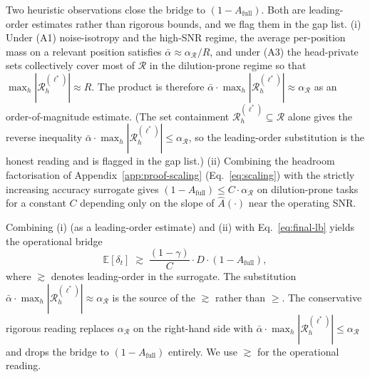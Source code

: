 Two heuristic observations close the bridge to $(1 - A_{\mathrm{full}})$.
Both are leading-order estimates rather than rigorous bounds, and we
flag them in the gap list.
(i) Under (A1) noise-isotropy and the high-SNR regime, the average
per-position mass on a relevant position satisfies $\bar\alpha \approx
\alpha_{\mathcal{R}} / R$, and under (A3) the head-private sets
collectively cover most of $\mathcal{R}$ in the dilution-prone regime so
that $\max_h |\mathcal{R}^{(\ell^*)}_h| \approx R$. The product is
therefore $\bar\alpha \cdot \max_h |\mathcal{R}^{(\ell^*)}_h| \approx
\alpha_{\mathcal{R}}$ as an order-of-magnitude estimate. (The set
containment $\mathcal{R}^{(\ell^*)}_h \subseteq \mathcal{R}$ alone gives
the reverse inequality $\bar\alpha \cdot \max_h |\mathcal{R}^{(\ell^*)}_h|
\leq \alpha_{\mathcal{R}}$, so the leading-order substitution is the
honest reading and is flagged in the gap list.)
(ii) Combining the headroom factorisation of
Appendix~\ref{app:proof-scaling} (Eq.~\eqref{eq:scaling}) with the
strictly increasing accuracy surrogate gives $(1 - A_{\mathrm{full}})
\leq C \cdot \alpha_{\mathcal{R}}$ on dilution-prone tasks for a
constant $C$ depending only on the slope of $\hat A(\cdot)$ near the
operating SNR.

Combining (i) (as a leading-order estimate) and (ii) with
Eq.~\eqref{eq:final-lb} yields the operational bridge
\begin{equation}
\label{eq:bridge-final}
\mathbb{E}[\delta_t]
\;\gtrsim\;
\frac{(1 - \gamma)}{C} \cdot D \cdot (1 - A_{\mathrm{full}}),
\end{equation}
where $\gtrsim$ denotes leading-order in the surrogate. The substitution
$\bar\alpha \cdot \max_h |\mathcal{R}^{(\ell^*)}_h| \approx
\alpha_{\mathcal{R}}$ is the source of the $\gtrsim$ rather than $\geq$.
The conservative rigorous reading replaces $\alpha_{\mathcal{R}}$ on the
right-hand side with $\bar\alpha \cdot \max_h |\mathcal{R}^{(\ell^*)}_h|
\leq \alpha_{\mathcal{R}}$ and drops the bridge to $(1 - A_{\mathrm{full}})$
entirely. We use $\gtrsim$ for the operational reading.

